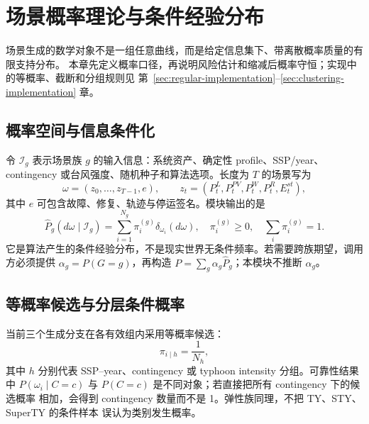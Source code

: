 \section{场景概率理论与条件经验分布}
\label{sec:scenario-probability-theory}

\begin{theorynote}
场景生成的数学对象不是一组任意曲线，而是给定信息集下、带离散概率质量的有限支持分布。
本章先定义概率口径，再说明风险估计和缩减后概率守恒；实现中的等概率、截断和分组规则见
第~\ref{sec:regular-implementation}--\ref{sec:clustering-implementation} 章。
\end{theorynote}

\subsection{概率空间与信息条件化}
令 $\mathcal I_g$ 表示场景族 $g$ 的输入信息：系统资产、确定性 profile、SSP/year、
contingency 或台风强度、随机种子和算法选项。长度为 $T$ 的场景写为
\begin{equation}
 \omega=(z_0,\ldots,z_{T-1},e),\qquad
 z_t=(P^L_t,P^{PV}_t,P^W_t,P^R_t,E^{st}_t),
\end{equation}
其中 $e$ 可包含故障、修复、轨迹与停运签名。模块输出的是
\begin{equation}
 \widehat P_g(d\omega\mid\mathcal I_g)
 =\sum_{i=1}^{N_g}\pi_i^{(g)}\delta_{\omega_i}(d\omega),
 \quad \pi_i^{(g)}\ge0,
 \quad \sum_i\pi_i^{(g)}=1.
\end{equation}
它是算法产生的条件经验分布，不是现实世界无条件频率。若需要跨族期望，调用方必须提供
$\alpha_g=P(G=g)$，再构造 $P=\sum_g\alpha_g\widehat P_g$；本模块不推断 $\alpha_g$。

\subsection{等概率候选与分层条件概率}
当前三个生成分支在各有效组内采用等概率候选：
\begin{equation}
 \pi_{i\mid h}=\frac1{N_h},
\end{equation}
其中 $h$ 分别代表 SSP--year、contingency 或 typhoon intensity 分组。可靠性结果中
$P(\omega_i\mid C=c)$ 与 $P(C=c)$ 是不同对象；若直接把所有 contingency 下的候选概率
相加，会得到 contingency 数量而不是 1。弹性族同理，不把 TY、STY、SuperTY 的条件样本
误认为类别发生概率。

